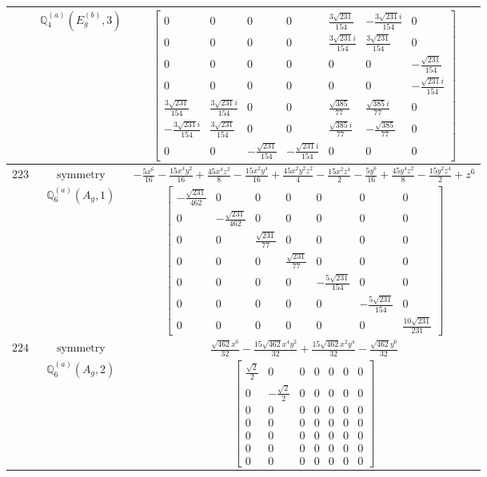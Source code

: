 \documentclass[fleqn,8pt,landscape]{jsarticle}
\begin{document}
\begin{longtable}{ccc}
$  $ & $ \mathbb{Q}_{4}^{(a)}(E_{g}^{(b)},3) $ & $ \begin{bmatrix} 0 & 0 & 0 & 0 & \frac{3 \sqrt{231}}{154} & - \frac{3 \sqrt{231} i}{154} & 0 \\ 0 & 0 & 0 & 0 & \frac{3 \sqrt{231} i}{154} & \frac{3 \sqrt{231}}{154} & 0 \\ 0 & 0 & 0 & 0 & 0 & 0 & - \frac{\sqrt{231}}{154} \\ 0 & 0 & 0 & 0 & 0 & 0 & - \frac{\sqrt{231} i}{154} \\ \frac{3 \sqrt{231}}{154} & \frac{3 \sqrt{231} i}{154} & 0 & 0 & \frac{\sqrt{385}}{77} & \frac{\sqrt{385} i}{77} & 0 \\ - \frac{3 \sqrt{231} i}{154} & \frac{3 \sqrt{231}}{154} & 0 & 0 & \frac{\sqrt{385} i}{77} & - \frac{\sqrt{385}}{77} & 0 \\ 0 & 0 & - \frac{\sqrt{231}}{154} & - \frac{\sqrt{231} i}{154} & 0 & 0 & 0 \end{bmatrix} $ \\ \hline
$ 223 $ & $ \text{symmetry} $ & $ - \frac{5 x^{6}}{16} - \frac{15 x^{4} y^{2}}{16} + \frac{45 x^{4} z^{2}}{8} - \frac{15 x^{2} y^{4}}{16} + \frac{45 x^{2} y^{2} z^{2}}{4} - \frac{15 x^{2} z^{4}}{2} - \frac{5 y^{6}}{16} + \frac{45 y^{4} z^{2}}{8} - \frac{15 y^{2} z^{4}}{2} + z^{6} $ \\
$  $ & $ \mathbb{Q}_{6}^{(a)}(A_{g},1) $ & $ \begin{bmatrix} - \frac{\sqrt{231}}{462} & 0 & 0 & 0 & 0 & 0 & 0 \\ 0 & - \frac{\sqrt{231}}{462} & 0 & 0 & 0 & 0 & 0 \\ 0 & 0 & \frac{\sqrt{231}}{77} & 0 & 0 & 0 & 0 \\ 0 & 0 & 0 & \frac{\sqrt{231}}{77} & 0 & 0 & 0 \\ 0 & 0 & 0 & 0 & - \frac{5 \sqrt{231}}{154} & 0 & 0 \\ 0 & 0 & 0 & 0 & 0 & - \frac{5 \sqrt{231}}{154} & 0 \\ 0 & 0 & 0 & 0 & 0 & 0 & \frac{10 \sqrt{231}}{231} \end{bmatrix} $ \\ \hline
$ 224 $ & $ \text{symmetry} $ & $ \frac{\sqrt{462} x^{6}}{32} - \frac{15 \sqrt{462} x^{4} y^{2}}{32} + \frac{15 \sqrt{462} x^{2} y^{4}}{32} - \frac{\sqrt{462} y^{6}}{32} $ \\
$  $ & $ \mathbb{Q}_{6}^{(a)}(A_{g},2) $ & $ \begin{bmatrix} \frac{\sqrt{2}}{2} & 0 & 0 & 0 & 0 & 0 & 0 \\ 0 & - \frac{\sqrt{2}}{2} & 0 & 0 & 0 & 0 & 0 \\ 0 & 0 & 0 & 0 & 0 & 0 & 0 \\ 0 & 0 & 0 & 0 & 0 & 0 & 0 \\ 0 & 0 & 0 & 0 & 0 & 0 & 0 \\ 0 & 0 & 0 & 0 & 0 & 0 & 0 \\ 0 & 0 & 0 & 0 & 0 & 0 & 0 \end{bmatrix} $ \\ \hline

\end{longtable}
\end{document}

